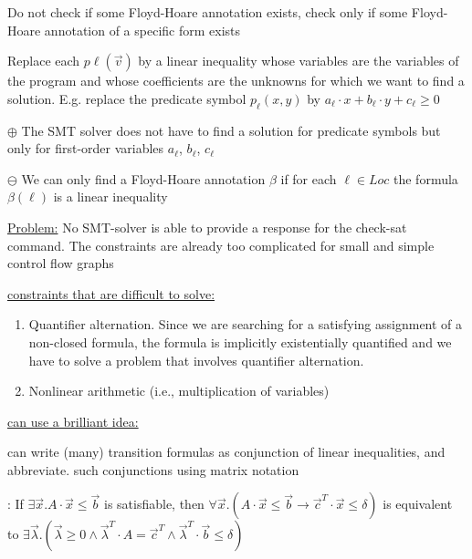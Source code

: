 \documentclass[landscape, a4paper]{article}
\begin{document}
\begin{minipage}[t]{0.2\linewidth}
\begin{betterlist}
\begin{betterlist}
			\item Do not check if some Floyd-Hoare annotation exists, check only if some Floyd-Hoare annotation of a specific form exists
			\item Replace each $p\ell(\vec{v})$ by a linear inequality whose variables are the variables of the program and whose coefficients are the unknowns for which we want to find a solution. E.g. replace the predicate symbol $p_{\ell}(x, y)$ by $a_{\ell} \cdot  x + b_{\ell} \cdot  y + c_{\ell} \geq 0$
			\item $\oplus$ The SMT solver does not have to find a solution for predicate symbols but only for first-order variables $a_{\ell}$, $b_{\ell}$, $c_{\ell}$
			\item $\ominus$ We can only find a Floyd-Hoare annotation $\beta$ if for each $\ell \in Loc$ the formula $\beta (\ell)$ is a linear inequality
		\end{betterlist}
		\item \underline{Problem:} No SMT-solver is able to provide a response for the check-sat command. The constraints are already too complicated for small and simple control flow graphs
		\begin{betterlist}
			\item \underline{constraints that are difficult to solve:}
			\begin{enumerate}
				\item Quantifier alternation. Since we are searching for a satisfying assignment of a non-closed formula, the formula is implicitly existentially quantified and we have to solve a problem that involves quantifier alternation.
				\item Nonlinear arithmetic (i.e., multiplication of variables)
			\end{enumerate}
			\item \underline{can use a brilliant idea:}
			\begin{betterlist}
				\item can write (many) transition formulas as conjunction of linear inequalities, and abbreviate. 
				such conjunctions using matrix notation
				\item \color{orange}: If $\exists\vec{x} . A \cdot \vec{x} \leq\vec{b}$ is satisfiable, then $\forall\vec{x} . (A \cdot \vec{x} \leq\vec{b} \rightarrow\vec{c}^T\cdot \vec{x} \leq \delta)$ is equivalent to $\exists\vec{\lambda} . ( \vec{\lambda} \geq 0 \land\vec{\lambda}^T\cdot A =\vec{c}^T\land\vec{\lambda}^T\cdot \vec{b} \leq \delta)$\color{black}

\end{betterlist}
\end{betterlist}
\end{betterlist}
\end{minipage}
\end{document}
